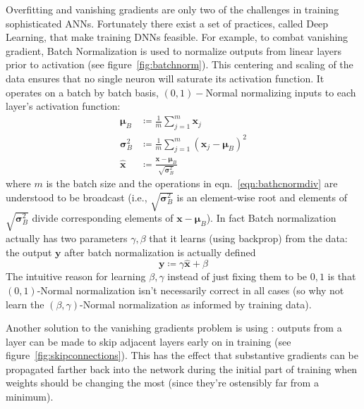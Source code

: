 

Overfitting and vanishing gradients are only two of the challenges in training sophisticated ANNs.
%
Fortunately there exist a set of practices, called Deep Learning, that make training DNNs feasible.
%
For example, to combat vanishing gradient, Batch Normalization \cite{ioffe2015batch} is used to normalize outputs from linear layers prior to activation (see figure~\ref{fig:batchnorm}).
%
This centering and scaling of the data ensures that no single neuron will saturate its activation function.
%
It operates on a batch by batch basis, \((0,1)-\)Normal normalizing inputs to each layer's activation function:
\begin{align}
    \bm{\mu} _{B}        & \coloneqq {\frac {1}{m}}\sum _{j=1}^{m}\bm{x}_{j}                                             \\
    \bm{\sigma} _{B}^{2} & \coloneqq{\frac {1}{m}}\sum _{j=1}^{m}(\bm{x}_{j}-\bm{\mu}_{B})^{2}                           \\
    {\hat {\bm{x}}}      & \coloneqq {\frac {\bm{x}-\bm{\mu}_{B}}{\sqrt {\bm{\sigma}_{B}^{2}}}} \label{eqn:bathcnormdiv}
\end{align}
where \(m\) is the batch size and the operations in eqn.~\eqref{eqn:bathcnormdiv} are understood to be broadcast (i.e., \(\sqrt {\bm{\sigma} _{B}^{2}}\) is an element-wise root and elements of \(\sqrt {\bm{\sigma} _{B}^{2}}\) divide corresponding elements of \(\bm{x}-\bm{\mu}_{B}\)).
%
In fact Batch normalization actually has two parameters \(\gamma, \beta\) that it learns (using backprop) from the data: the output \(\bm{y}\) after batch normalization is actually defined
\begin{equation}
    \bm{y} \coloneqq \gamma \bm{\hat{x}} + \beta 
\end{equation}
The intuitive reason for learning \(\beta, \gamma\) instead of just fixing them to be \(0,1\) is that \((0,1)\)-Normal normalization isn't necessarily correct in all cases (so why not learn the \((\beta,\gamma)\)-Normal normalization as informed by training data).
%


Another solution to the vanishing gradients problem is using : outputs from a layer can be made to skip adjacent layers early on in training (see figure~\ref{fig:skipconnections}).
%
This has the effect that substantive gradients can be propagated farther back into the network during the initial part of training when weights should be changing the most (since they're ostensibly far from a minimum).

